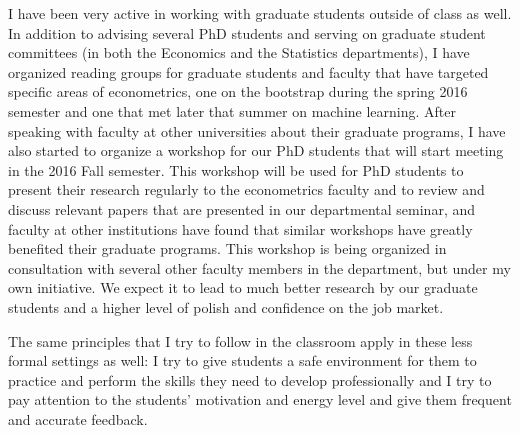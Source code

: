 \documentclass[12pt]{article}%
\begin{document}
I have been very active in working with graduate students outside of
class as well. In addition to advising several PhD students and
serving on graduate student committees (in both the Economics and the
Statistics departments), I have organized reading groups for graduate
students and faculty that have targeted specific areas of
econometrics, one on the bootstrap during the spring 2016 semester and
one that met later that summer on machine learning. After speaking
with faculty at other universities about their graduate programs, I
have also started to organize a workshop for our PhD students that
will start meeting in the 2016 Fall semester. This workshop will be
used for PhD students to present their research regularly to the
econometrics faculty and to review and discuss relevant papers that
are presented in our departmental seminar, and faculty at other
institutions have found that similar workshops have greatly benefited
their graduate programs. This workshop is being organized in
consultation with several other faculty members in the department, but
under my own initiative. We expect it to lead to much better research
by our graduate students and a higher level of polish and confidence
on the job market.

The same principles that I try to follow in the classroom apply in
these less formal settings as well: I try to give students a safe
environment for them to practice and perform the skills they need to
develop professionally and I try to pay attention to the students'
motivation and energy level and give them frequent and accurate
feedback.
\end{document}
